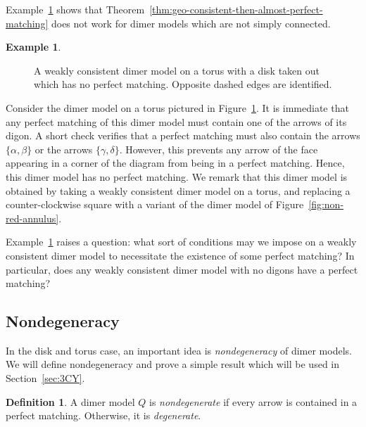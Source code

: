 \documentclass{article}
\theoremstyle{definition}
\newtheorem{defn}[thm]{Definition}
\newtheorem{example}[thm]{Example}
\begin{document}
Example~\ref{ex:cons-tor-no-perf} shows that Theorem~\ref{thm:geo-consistent-then-almost-perfect-matching} does not work for dimer models which are not simply connected. 


\begin{example}\label{ex:cons-tor-no-perf}
	\def\svgwidth{130pt}
\begin{figure}
	\centering
	
	\caption{A weakly consistent dimer model on a torus with a disk taken out which has no perfect matching. Opposite dashed edges are identified.}
	\label{fig:cons-tor-no-perf}
\end{figure}
	Consider the dimer model on a torus pictured in Figure~\ref{fig:cons-tor-no-perf}. It is immediate that any perfect matching of this dimer model must contain one of the arrows of its digon.  A short check verifies that a perfect matching must also contain the arrows $\{\alpha, \beta\}$ or the arrows $\{\gamma, \delta\}$.  However, this prevents any arrow of the face appearing in a corner of the diagram from being in a perfect matching.  Hence, this dimer model has no perfect matching.
	We remark that this dimer model is obtained by taking a weakly consistent dimer model on a torus, and replacing a counter-clockwise square with a variant of the dimer model of Figure~\ref{fig:non-red-annulus}.
\end{example}

Example~\ref{ex:cons-tor-no-perf} raises a question: what sort of conditions may we impose on a weakly consistent dimer model to necessitate the existence of some perfect matching?
In particular, does any weakly consistent dimer model with no digons have a perfect matching?

\subsection{Nondegeneracy}
\label{sec:nondeg}

In the disk and torus case, an important idea is \textit{nondegeneracy} of dimer models. We will define nondegeneracy and prove a simple result which will be used in Section~\ref{sec:3CY}.
\begin{defn}\label{defn:nondeg}
	A dimer model $Q$ is \textit{nondegenerate} if every arrow is contained in a perfect matching. Otherwise, it is \textit{degenerate}.
\end{defn}
\end{document}
